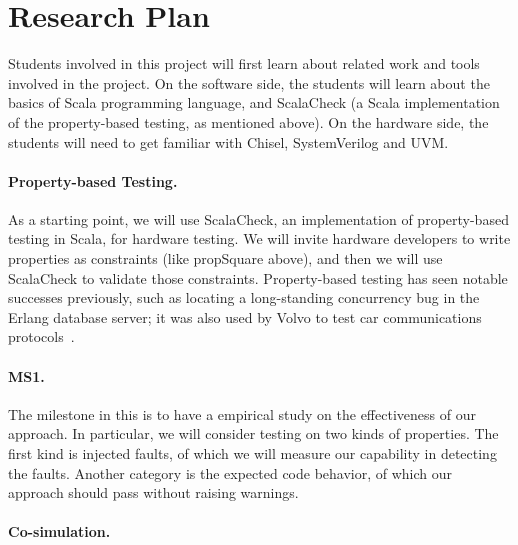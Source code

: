 \documentclass[fleqn,12pt]{article}
\begin{document}
\section{Research Plan}







Students involved in this project will first learn about related work and
tools involved in the project. On the software side, the students will learn
about the basics of Scala programming language, and ScalaCheck (a
Scala implementation of the property-based testing, as mentioned
above). On the hardware side, the students will need to get familiar with Chisel,
SystemVerilog and UVM.



\paragraph{Property-based Testing.}
As a starting point, we will use ScalaCheck, an implementation of
property-based testing in Scala, for hardware testing. We will invite
hardware developers to write properties as constraints (like
propSquare above), and then we will use ScalaCheck to validate those
constraints. Property-based testing has seen notable successes
previously, such as locating a long-standing concurrency bug in the
Erlang database server; it was also used by Volvo to test car
communications protocols~\cite{DBLP:conf/icse/HughesNSA16}.

\paragraph{MS1.} The milestone in this is to have a empirical study on the effectiveness of our approach. In particular,  we will consider testing on two kinds of properties. The first kind is injected faults, of which we will measure our capability in detecting the faults. Another category is the expected code behavior, of which our approach should  pass without raising  warnings. 

\paragraph{Co-simulation.}
\end{document}
